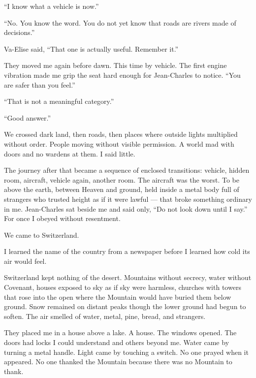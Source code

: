 ``I know what a vehicle is now.''\par

``No. You know the word. You do not yet know that roads are rivers made of decisions.''\par

Va-Elise said, ``That one is actually useful. Remember it.''\par

They moved me again before dawn. This time by vehicle. The first engine vibration made me grip the seat hard enough for Jean-Charles to notice. ``You are safer than you feel.''\par

``That is not a meaningful category.''\par

``Good answer.''\par

We crossed dark land, then roads, then places where outside lights multiplied without order. People moving without visible permission. A world mad with doors and no wardens at them. I said little.\par

The journey after that became a sequence of enclosed transitions: vehicle, hidden room, aircraft, vehicle again, another room. The aircraft was the worst. To be above the earth, between Heaven and ground, held inside a metal body full of strangers who trusted height as if it were lawful --- that broke something ordinary in me. Jean-Charles sat beside me and said only, ``Do not look down until I say.'' For once I obeyed without resentment.\par

We came to Switzerland.\par

I learned the name of the country from a newspaper before I learned how cold its air would feel.\par

Switzerland kept nothing of the desert. Mountains without secrecy, water without Covenant, houses exposed to sky as if sky were harmless, churches with towers that rose into the open where the Mountain would have buried them below ground. Snow remained on distant peaks though the lower ground had begun to soften. The air smelled of water, metal, pine, bread, and strangers.\par

They placed me in a house above a lake. A house. The windows opened. The doors had locks I could understand and others beyond me. Water came by turning a metal handle. Light came by touching a switch. No one prayed when it appeared. No one thanked the Mountain because there was no Mountain to thank.\par

